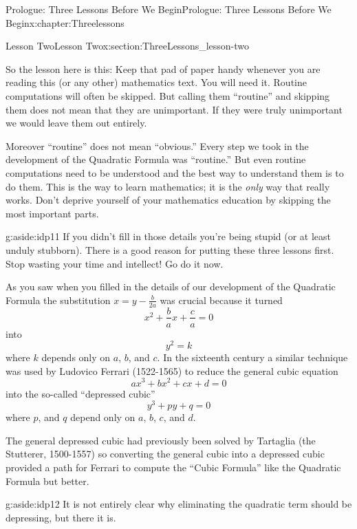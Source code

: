 \begin{chapterptx}{Prologue: Three Lessons Before We Begin}{}{Prologue: Three Lessons Before We Begin}{}{}{x:chapter:Threelessons}
\begin{sectionptx}{Lesson Two}{}{Lesson Two}{}{}{x:section:ThreeLessons_lesson-two}
		\par
		So the lesson here is this: Keep that pad of paper handy whenever you are reading this (or any other) mathematics text. You will need it. Routine computations will often be skipped. But calling them ``routine'' and skipping them does not mean that they are unimportant. If they were truly unimportant we would leave them out entirely.%
		\par
		Moreover ``routine'' does not mean ``obvious.'' Every step we took in the development of the Quadratic Formula was ``routine.'' But even routine computations need to be understood and the best way to understand them is to do them. This is the way to learn mathematics; it is the \emph{only} way that really works. Don't deprive yourself of your mathematics education by skipping the most important parts.%
		\begin{aside}{}{g:aside:idp11}%
			If you didn't fill in those details you're being stupid (or at least unduly stubborn). There is a good reason for putting these three lessons first. Stop wasting your time and intellect! Go do it now.%
		\end{aside}
		As you saw when you filled in the details of our development of the Quadratic Formula the substitution \(x=y-\frac{b}{2a}\) was crucial because it turned%
		\begin{equation*}
			x^2+\frac{b}{a}x +\frac{c}{a}=0
		\end{equation*}
		into%
		\begin{equation*}
			y^2=k
		\end{equation*}
		where \(k\) depends only on \(a\), \(b\), and \(c\). In the sixteenth century a similar technique was used by Ludovico Ferrari (1522-1565) to reduce the general cubic equation%
		\begin{equation}
			ax^3+bx^2+cx+d=0\label{x:men:eq_GenCubic}
		\end{equation}
		into the so-called ``depressed cubic''%
		\begin{equation*}
			y^3 +py+q=0
		\end{equation*}
		where \(p\), and \(q\) depend only on \(a\), \(b\), \(c\), and \(d\).%
		\par
		The general depressed cubic had previously been solved by Tartaglia (the Stutterer, 1500-1557) so converting the general cubic into a depressed cubic provided a path for Ferrari to compute the ``Cubic Formula'' \textemdash{} like the Quadratic Formula but better.%
		\begin{aside}{}{g:aside:idp12}%
			It is not entirely clear why eliminating the quadratic term should be depressing, but there it is.%

\end{aside}
\end{sectionptx}
\end{chapterptx}

